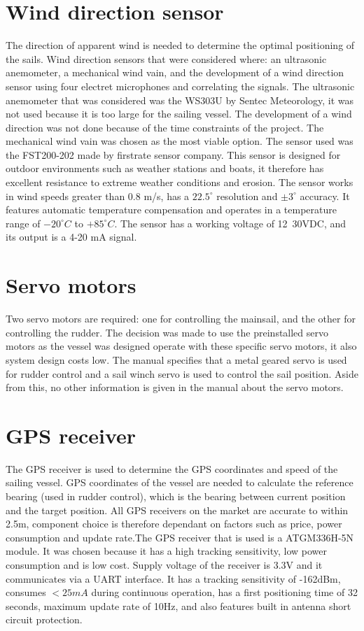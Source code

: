 \section{Wind direction sensor}
The direction of apparent wind is needed to determine the optimal positioning of the sails. Wind direction sensors that were considered where: an ultrasonic 
anemometer, a mechanical wind vain, and the development of a wind direction sensor using four electret microphones and correlating the signals. The ultrasonic
anemometer that was considered was the WS303U by Sentec Meteorology, it was not used because it is too large for the sailing vessel. The development of a 
wind direction was not done because of the time constraints of the project. The mechanical wind vain was chosen as the most viable option. The sensor used was 
the FST200-202\cite{wind_sensor} made by firstrate sensor company. This sensor is designed for outdoor environments such as weather stations and boats, it therefore has 
excellent resistance to extreme weather conditions and erosion. The sensor works in wind speeds greater than 0.8 m/s, has a $22.5^{\circ}$ resolution and 
$\pm 3^{\circ}$ accuracy. It features automatic temperature compensation and operates in a temperature range of $-20^{\circ}C$ to $+85^{\circ}C$. The 
sensor has a working voltage of 12~30VDC, and its output is a 4-20 mA signal. 

\section{Servo motors}
Two servo motors are required: one for controlling the mainsail, and the other for controlling the rudder. The decision was made to use the preinstalled servo motors as the vessel was designed operate with these specific 
servo motors, it also system design costs low. The manual specifies that a metal geared servo is used for rudder control
and a sail winch servo is used to control the sail position. Aside from this, no other information is given in the manual about the servo motors.  

\section{GPS receiver}
The GPS receiver is used to determine the GPS coordinates and speed of the sailing vessel. GPS coordinates of the vessel are needed to calculate the reference bearing 
(used in rudder control),
which is the bearing between current position and the target position. All GPS receivers on the market are accurate to within 2.5m, component choice is 
therefore dependant on factors such as price, power consumption and update rate.The GPS receiver that is used is a ATGM336H-5N\cite{GPS} module. It was chosen because it 
has a high tracking sensitivity, low power consumption and is low cost. Supply voltage of the receiver is 3.3V and it communicates via a UART interface. It has a 
tracking sensitivity of -162dBm, consumes $<25mA$ during continuous operation, 
has a first positioning time of 32 seconds, maximum update rate of 10Hz, and also features built in antenna short circuit protection.

